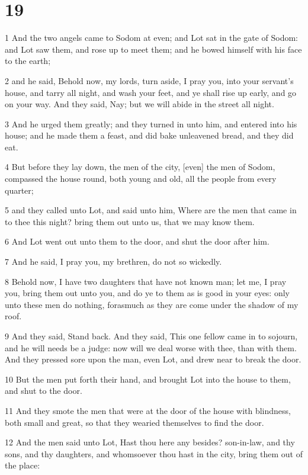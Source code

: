 \chapter{19}

\par 1 And the two angels came to Sodom at even; and Lot sat in the gate of Sodom: and Lot saw them, and rose up to meet them; and he bowed himself with his face to the earth;
\par 2 and he said, Behold now, my lords, turn aside, I pray you, into your servant's house, and tarry all night, and wash your feet, and ye shall rise up early, and go on your way. And they said, Nay; but we will abide in the street all night.
\par 3 And he urged them greatly; and they turned in unto him, and entered into his house; and he made them a feast, and did bake unleavened bread, and they did eat.
\par 4 But before they lay down, the men of the city, [even] the men of Sodom, compassed the house round, both young and old, all the people from every quarter;
\par 5 and they called unto Lot, and said unto him, Where are the men that came in to thee this night? bring them out unto us, that we may know them.
\par 6 And Lot went out unto them to the door, and shut the door after him.
\par 7 And he said, I pray you, my brethren, do not so wickedly.
\par 8 Behold now, I have two daughters that have not known man; let me, I pray you, bring them out unto you, and do ye to them as is good in your eyes: only unto these men do nothing, forasmuch as they are come under the shadow of my roof.
\par 9 And they said, Stand back. And they said, This one fellow came in to sojourn, and he will needs be a judge: now will we deal worse with thee, than with them. And they pressed sore upon the man, even Lot, and drew near to break the door.
\par 10 But the men put forth their hand, and brought Lot into the house to them, and shut to the door.
\par 11 And they smote the men that were at the door of the house with blindness, both small and great, so that they wearied themselves to find the door.
\par 12 And the men said unto Lot, Hast thou here any besides? son-in-law, and thy sons, and thy daughters, and whomsoever thou hast in the city, bring them out of the place:
